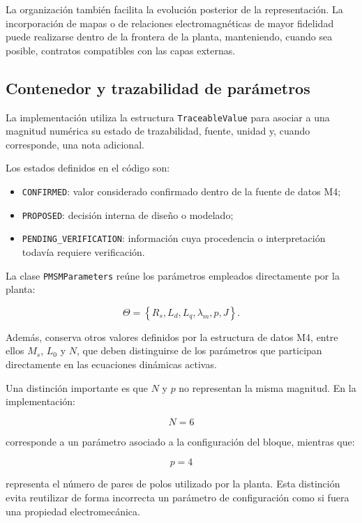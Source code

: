 La organización también facilita la evolución posterior de la representación. La incorporación de mapas o de relaciones electromagnéticas de mayor fidelidad puede realizarse dentro de la frontera de la planta, manteniendo, cuando sea posible, contratos compatibles con las capas externas.

\subsection{Contenedor y trazabilidad de parámetros}

La implementación utiliza la estructura \texttt{TraceableValue} para asociar a una magnitud numérica su estado de trazabilidad, fuente, unidad y, cuando corresponde, una nota adicional.

Los estados definidos en el código son:

\begin{itemize}
\item \texttt{CONFIRMED}: valor considerado confirmado dentro de la fuente de datos M4;
\item \texttt{PROPOSED}: decisión interna de diseño o modelado;
\item \texttt{PENDING\_VERIFICATION}: información cuya procedencia o interpretación todavía requiere verificación.
\end{itemize}

La clase \texttt{PMSMParameters} reúne los parámetros empleados directamente por la planta:

\begin{equation}
\Theta =
\left\{
R_s,L_d,L_q,\lambda_m,p,J
\right\}.
\end{equation}

Además, conserva otros valores definidos por la estructura de datos M4, entre ellos $M_s$, $L_0$ y $N$, que deben distinguirse de los parámetros que participan directamente en las ecuaciones dinámicas activas.

Una distinción importante es que $N$ y $p$ no representan la misma magnitud. En la implementación:

\begin{equation}
N=6
\end{equation}

corresponde a un parámetro asociado a la configuración del bloque, mientras que:

\begin{equation}
p=4
\end{equation}

representa el número de pares de polos utilizado por la planta. Esta distinción evita reutilizar de forma incorrecta un parámetro de configuración como si fuera una propiedad electromecánica.

